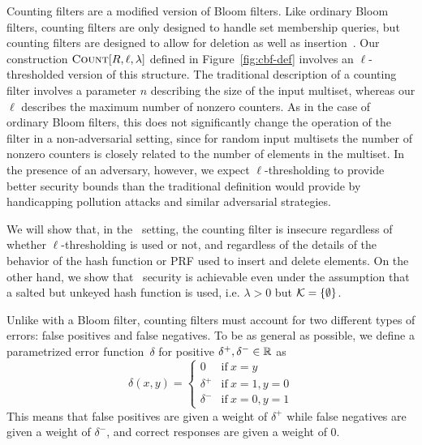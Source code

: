 Counting filters are a modified version of Bloom filters. Like ordinary
Bloom filters, counting filters are only designed to handle set membership
queries, but counting filters are designed to
allow for deletion as well as insertion~\cite{fan2000summary}.
%
Our construction
$\textnormal{\textsc{Count}}[R,\ell,\lambda]$ defined in Figure~\ref{fig:cbf-def} involves an
$\ell$-thresholded version of this structure. The traditional description of
a counting filter involves a parameter $n$ describing the size of the input
multiset, whereas our $\ell$ describes the maximum number of nonzero counters. As
in the case of ordinary Bloom filters, this does not significantly change the operation
of the filter in a non-adversarial setting, since for random input multisets the
number of nonzero counters is closely related to the number of elements in the
multiset.
%
In the presence of an adversary, however, we expect $\ell$-thresholding to
provide better security bounds than the traditional definition would provide by
handicapping pollution attacks and similar adversarial strategies.

We will show that, in the \errep\ setting, the counting filter is
insecure regardless of whether $\ell$-thresholding is used or not, and
regardless of the details of the behavior of the hash function or PRF used to
insert and delete elements. On the other
hand, we show that \erreps\ security is achievable even under the assumption
that a salted but unkeyed hash function is used, i.e. $\lambda > 0$ but $\mathcal{K} =
\{\emptyset\}$.

%
Unlike with a Bloom filter, counting filters must account
for two different types of errors: false positives and false negatives. To be as
general as possible, we define a parametrized error function~$\delta$ for
positive $\delta^+, \delta^- \in \mathbb{R}$ as
\begin{equation}
  \delta(x, y) =
  \begin{cases}
    0 & \text{if}\ x = y \\
    \delta^+ & \text{if}\ x = 1, y = 0 \\
    \delta^- & \text{if}\ x = 0, y = 1
  \end{cases}
\end{equation}
This means that false positives are given a weight of $\delta^+$ while false
negatives are given a weight of $\delta^-$, and correct responses are given a
weight of 0.

